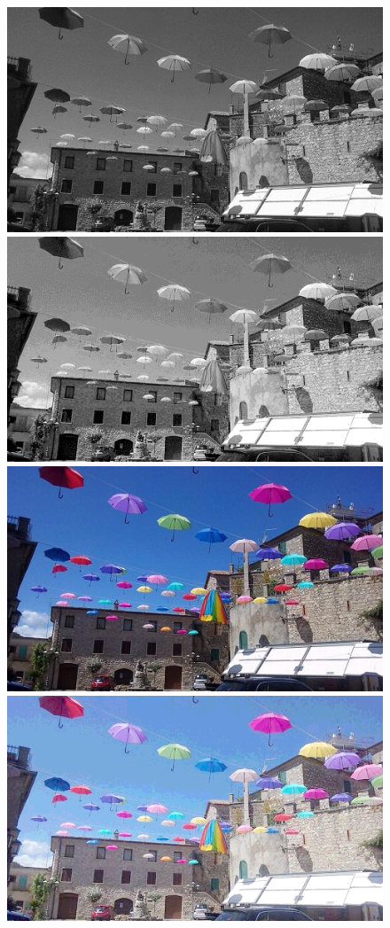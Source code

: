 \documentclass{article}
\begin{document}
	\begin{figure}[!ht]	
	\centering	
	\includegraphics{img/gray-obraz1}	
	\includegraphics{img/arytmetyczne/pierwiastkowanie_obrazu-gray}
	\includegraphics{img/rgb-obraz1}	
	\includegraphics{img/arytmetyczne/pierwiastkowanie_obrazu-rgb}

\end{figure}
\end{document}
